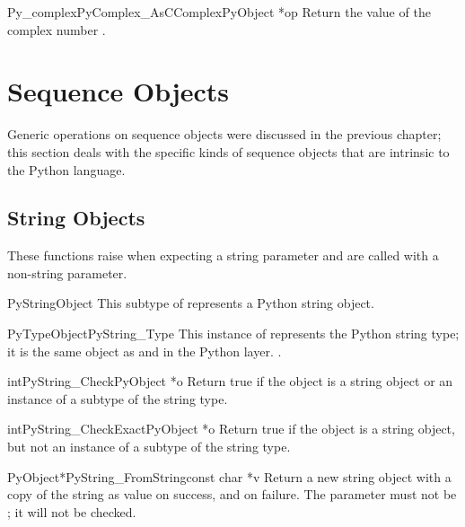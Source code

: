 \begin{cfuncdesc}{Py_complex}{PyComplex_AsCComplex}{PyObject *op}
  Return the  value of the complex number
  .
\end{cfuncdesc}



\section{Sequence Objects \label{sequenceObjects}}

Generic operations on sequence objects were discussed in the previous
chapter; this section deals with the specific kinds of sequence
objects that are intrinsic to the Python language.


\subsection{String Objects \label{stringObjects}}

These functions raise  when expecting a string
parameter and are called with a non-string parameter.

\begin{ctypedesc}{PyStringObject}
  This subtype of  represents a Python string object.
\end{ctypedesc}

\begin{cvardesc}{PyTypeObject}{PyString_Type}
  This instance of  represents the Python string
  type; it is the same object as  and 
  in the Python layer.
  .
\end{cvardesc}

\begin{cfuncdesc}{int}{PyString_Check}{PyObject *o}
  Return true if the object  is a string object or an instance
  of a subtype of the string type.
\end{cfuncdesc}

\begin{cfuncdesc}{int}{PyString_CheckExact}{PyObject *o}
  Return true if the object  is a string object, but not an
  instance of a subtype of the string type.
\end{cfuncdesc}

\begin{cfuncdesc}{PyObject*}{PyString_FromString}{const char *v}
  Return a new string object with a copy of the string  as value
  on success, and \NULL{} on failure.  The parameter  must not be
  \NULL{}; it will not be checked.
\end{cfuncdesc}

